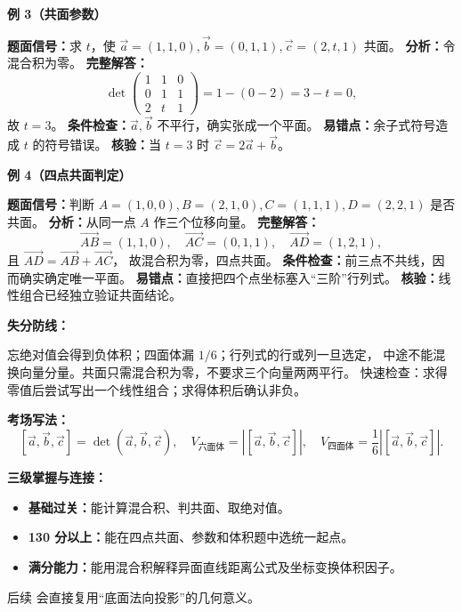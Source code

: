 \begin{knowledgeBox}
\textbf{例 3（共面参数）}

\textbf{题面信号：}求 \(t\)，使
\(\vec a=(1,1,0),\vec b=(0,1,1),\vec c=(2,t,1)\) 共面。
\textbf{分析：}令混合积为零。
\textbf{完整解答：}
\[
\det\begin{pmatrix}1&1&0\\0&1&1\\2&t&1\end{pmatrix}
=1-(0-2)=3-t=0,
\]
故 \(t=3\)。
\textbf{条件检查：}\(\vec a,\vec b\) 不平行，确实张成一个平面。
\textbf{易错点：}余子式符号造成 \(t\) 的符号错误。
\textbf{核验：}当 \(t=3\) 时 \(\vec c=2\vec a+\vec b\)。

\textbf{例 4（四点共面判定）}

\textbf{题面信号：}判断
\(A=(1,0,0),B=(2,1,0),C=(1,1,1),D=(2,2,1)\) 是否共面。
\textbf{分析：}从同一点 \(A\) 作三个位移向量。
\textbf{完整解答：}
\[
\overrightarrow{AB}=(1,1,0),\quad
\overrightarrow{AC}=(0,1,1),\quad
\overrightarrow{AD}=(1,2,1),
\]
且 \(\overrightarrow{AD}=\overrightarrow{AB}+\overrightarrow{AC}\)，
故混合积为零，四点共面。
\textbf{条件检查：}前三点不共线，因而确实确定唯一平面。
\textbf{易错点：}直接把四个点坐标塞入“三阶”行列式。
\textbf{核验：}线性组合已经独立验证共面结论。

\textbf{失分防线：}

忘绝对值会得到负体积；四面体漏 \(1/6\)；行列式的行或列一旦选定，
中途不能混换向量分量。共面只需混合积为零，不要求三个向量两两平行。
快速检查：求得零值后尝试写出一个线性组合；求得体积后确认非负。

\textbf{考场写法：}
\[
\boxed{[\vec a,\vec b,\vec c]=\det(\vec a,\vec b,\vec c),\quad
V_{\text{六面体}}=|[\vec a,\vec b,\vec c]|,\quad
V_{\text{四面体}}=\frac16|[\vec a,\vec b,\vec c]|.}
\]

\textbf{三级掌握与连接：}
\begin{itemize}
  \item \textbf{基础过关：}能计算混合积、判共面、取绝对值。
  \item \textbf{130 分以上：}能在四点共面、参数和体积题中选统一起点。
  \item \textbf{满分能力：}能用混合积解释异面直线距离公式及坐标变换体积因子。
\end{itemize}
后续 
会直接复用“底面法向投影”的几何意义。
\end{knowledgeBox}


\par

